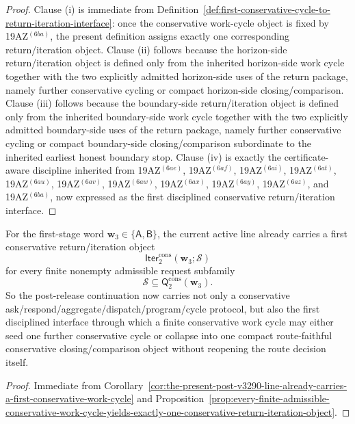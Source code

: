 \begin{proof}
Clause (i) is immediate from Definition~\ref{def:first-conservative-cycle-to-return-iteration-interface}: once the conservative work-cycle object is fixed by 19AZ$^{(6ba)}$, the present definition assigns exactly one corresponding return/iteration object. Clause (ii) follows because the horizon-side return/iteration object is defined only from the inherited horizon-side work cycle together with the two explicitly admitted horizon-side uses of the return package, namely further conservative cycling or compact horizon-side closing/comparison. Clause (iii) follows because the boundary-side return/iteration object is defined only from the inherited boundary-side work cycle together with the two explicitly admitted boundary-side uses of the return package, namely further conservative cycling or compact boundary-side closing/comparison subordinate to the inherited earliest honest boundary stop. Clause (iv) is exactly the certificate-aware discipline inherited from 19AZ$^{(6ae)}$, 19AZ$^{(6af)}$, 19AZ$^{(6ai)}$, 19AZ$^{(6at)}$, 19AZ$^{(6au)}$, 19AZ$^{(6av)}$, 19AZ$^{(6aw)}$, 19AZ$^{(6ax)}$, 19AZ$^{(6ay)}$, 19AZ$^{(6az)}$, and 19AZ$^{(6ba)}$, now expressed as the first disciplined conservative return/iteration interface.
\end{proof}

\begin{corollary}
\label{cor:the-present-post-v3290-line-already-carries-a-first-conservative-return-iteration-interface}
For the first-stage word \(\mathbf w_3\in\{\mathsf A,\mathsf B\}\), the current active line already carries a first conservative return/iteration object
\[
 \mathsf{Iter}^{\mathrm{cons}}_{2}(\mathbf w_3;\mathcal S)
\]
for every finite nonempty admissible request subfamily
\[
 \mathcal S\subseteq \mathsf{Q}^{\mathrm{cons}}_{2}(\mathbf w_3).
\]
So the post-release continuation now carries not only a conservative ask/respond/aggregate/dispatch/program/cycle protocol, but also the first disciplined interface through which a finite conservative work cycle may either seed one further conservative cycle or collapse into one compact route-faithful conservative closing/comparison object without reopening the route decision itself.
\end{corollary}

\begin{proof}
Immediate from Corollary~\ref{cor:the-present-post-v3290-line-already-carries-a-first-conservative-work-cycle} and Proposition~\ref{prop:every-finite-admissible-conservative-work-cycle-yields-exactly-one-conservative-return-iteration-object}.
\end{proof}


